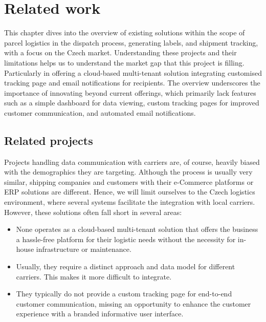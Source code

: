 \chapter{Related work}
\label{chap:related-work}
This chapter dives into the overview of existing solutions within the scope of parcel logistics in the dispatch process, generating labels, and shipment tracking, with a focus on the Czech market.
Understanding these projects and their limitations helps us to understand the market gap that this project is filling.
Particularly in offering a cloud-based multi-tenant solution integrating customised tracking page and email notifications for recipients.
The overview underscores the importance of innovating beyond current offerings, which primarily lack features such as a simple dashboard for data viewing, custom tracking pages for improved customer communication, and automated email notifications.

\section{Related projects}
\label{sec:related-projects}

Projects handling data communication with carriers are, of course, heavily biased with the demographics they are targeting. 
Although the process is usually very similar, shipping companies and customers with their e-Commerce platforms or \ac{ERP} solutions are different.
Hence, we will limit ourselves to the Czech logistics environment, where several systems facilitate the integration with local carriers. However, these solutions often fall short in several areas:
\begin{itemize}
    \item None operates as a cloud-based multi-tenant solution that offers the business a hassle-free platform for their logistic needs without the necessity for in-house infrastructure or maintenance.
    \item Usually, they require a distinct approach and data model for different carriers. This makes it more difficult to integrate.
    \item They typically do not provide a custom tracking page for end-to-end customer communication, missing an opportunity to enhance the customer experience with a branded informative user interface.
\end{itemize}

